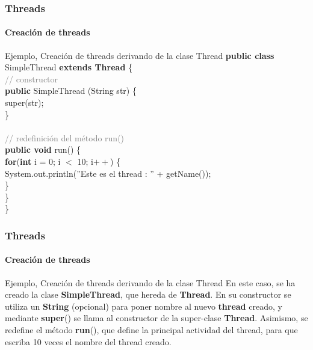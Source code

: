 \documentclass{beamer}
\begin{document}
	\begin{frame}
		\frametitle{Threads}
		\framesubtitle{Creaci\'on de threads}

		\begin{block}{Ejemplo, Creaci\'on de threads derivando de la clase Thread}
            \textbf{public class} SimpleThread \textbf{extends Thread} \{ \\
            \hspace*{10pt}\textcolor{gray}{// constructor} \\
            \hspace*{10pt}\textbf{public} SimpleThread (String str) \{ \\
            \hspace*{20pt}super(str);\\
            \hspace*{10pt}\} \\ ~\\
            \hspace*{10pt}\textcolor{gray}{// redefinici\'on del m\'etodo run()}\\
            \hspace*{10pt}\textbf{public void} run() \{\\
            \hspace*{20pt}\textbf{for}(\textbf{int} i = 0; i $<$ 10; i$++$) \{\\
            \hspace*{30pt}System.out.println(''Este es el thread : '' + getName());\\
            \hspace*{20pt}\} \\
            \hspace*{10pt}\} \\
            \}
        \end{block}
	\end{frame}
	
	\begin{frame}
		\frametitle{Threads}
		\framesubtitle{Creaci\'on de threads}

		\begin{block}{Ejemplo, Creaci\'on de threads derivando de la clase Thread}
            En este caso, se ha creado la clase \textbf{SimpleThread}, que hereda de \textbf{Thread}. En su constructor se utiliza un \textbf{String} (opcional) para poner nombre al nuevo \textbf{thread} creado, y mediante \textbf{super}() se llama al constructor de la super-clase \textbf{Thread}. Asimismo, se redefine el m\'etodo \textbf{run}(), que define la principal actividad del thread, para que escriba 10 veces el nombre del thread creado.
        \end{block}
	\end{frame}	
	
\end{document}
